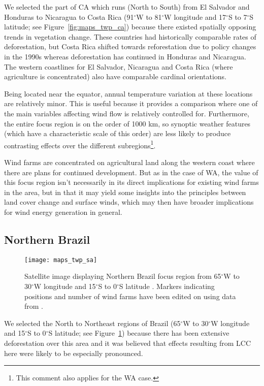 We selected the part of \ac{CA} which runs (North to South) from El Salvador and Honduras to Nicaragua to Costa Rica (91$^\circ$W to 81$^\circ$W longitude and 17$^\circ$S to 7$^\circ$S latitude; see Figure~\ref{fig:maps_twp_ca}) because there existed spatially opposing trends in vegetation change. These countries had historically comparable rates of deforestation, but Costa Rica shifted towards reforestation due to policy changes in the 1990s whereas deforestation has continued in Honduras and Nicaragua. The western coastlines for El Salvador, Nicaragua and Costa Rica (where agriculture is concentrated) also have comparable cardinal orientations.

Being located near the equator, annual temperature variation at these locations are relatively minor. This is useful because it provides a comparison where one of the main variables affecting wind flow is relatively controlled for. Furthermore, the entire focus region is on the order of 1000 km, so synoptic weather features (which have a characteristic scale of this order) are less likely to produce contrasting effects over the different subregions\footnote{This comment also applies for the \ac{WA} case.}.

Wind farms are concentrated on agricultural land along the western coast where there are plans for continued development. But as in the case of \ac{WA}, the value of this focus region isn't necessarily in its direct implications for existing wind farms in the area, but in that it may yield some insights into the principles between land cover change and surface winds, which may then have broader implications for wind energy generation in general.

\subsection{Northern Brazil}

\begin{figure}[!ht]
	\centering
	\texttt{[image: maps\_twp\_sa]}
	\caption[Northern Brazil Map]{Satellite image displaying Northern Brazil focus region from 65$^\circ$W to 30$^\circ$W longitude and 15$^\circ$S to 0$^\circ$S latitude \citep{maps_sa}. Markers indicating positions and number of wind farms have been edited on using data from \citep{twp_br}.}
	\label{fig:maps_twp_sa}
\end{figure}

We selected the North to Northeast regions of Brazil (65$^\circ$W to 30$^\circ$W longitude and 15$^\circ$S to 0$^\circ$S latitude; see Figure~\ref{fig:maps_twp_sa}) because there has been extensive deforestation over this area and it was believed that effects resulting from \ac{LCC} here were likely to be especially pronounced.

